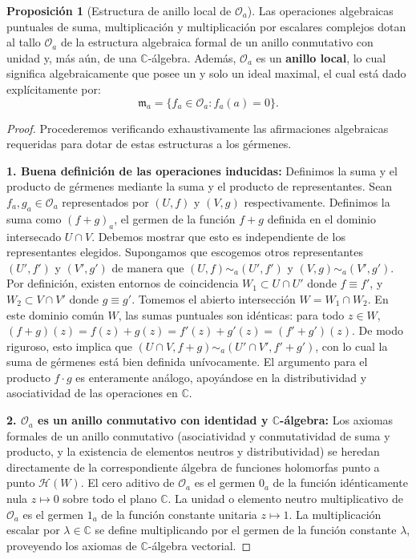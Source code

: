 \documentclass[11pt,a4paper]{article}
\theoremstyle{definition}
\newtheorem{proposicion}{Proposición}[section]
\theoremstyle{remark}
\numberwithin{equation}{section}
\begin{document}
\begin{proposicion}[Estructura de anillo local de $\mathcal{O}_a$]
Las operaciones algebraicas puntuales de suma, multiplicación y multiplicación por escalares complejos dotan al tallo $\mathcal{O}_a$ de la estructura algebraica formal de un anillo conmutativo con unidad y, más aún, de una $\mathbb{C}$-álgebra. Además, $\mathcal{O}_a$ es un \textbf{anillo local}, lo cual significa algebraicamente que posee un y solo un ideal maximal, el cual está dado explícitamente por:
\begin{equation}
\mathfrak{m}_a = \{ f_a \in \mathcal{O}_a : f_a(a) = 0 \}.
\end{equation}
\end{proposicion}
\begin{proof}
Procederemos verificando exhaustivamente las afirmaciones algebraicas requeridas para dotar de estas estructuras a los gérmenes.

\textbf{1. Buena definición de las operaciones inducidas:}
Definimos la suma y el producto de gérmenes mediante la suma y el producto de representantes. Sean $f_a, g_a \in \mathcal{O}_a$ representados por $(U, f)$ y $(V, g)$ respectivamente. Definimos la suma como $(f+g)_a$, el germen de la función $f+g$ definida en el dominio intersecado $U \cap V$. Debemos mostrar que esto es independiente de los representantes elegidos. Supongamos que escogemos otros representantes $(U', f')$ y $(V', g')$ de manera que $(U, f) \sim_a (U', f')$ y $(V, g) \sim_a (V', g')$. Por definición, existen entornos de coincidencia $W_1 \subset U \cap U'$ donde $f \equiv f'$, y $W_2 \subset V \cap V'$ donde $g \equiv g'$. Tomemos el abierto intersección $W = W_1 \cap W_2$. En este dominio común $W$, las sumas puntuales son idénticas: para todo $z \in W$, $(f+g)(z) = f(z)+g(z) = f'(z)+g'(z) = (f'+g')(z)$. De modo riguroso, esto implica que $(U \cap V, f+g) \sim_a (U' \cap V', f'+g')$, con lo cual la suma de gérmenes está bien definida unívocamente. El argumento para el producto $f \cdot g$ es enteramente análogo, apoyándose en la distributividad y asociatividad de las operaciones en $\mathbb{C}$.

\textbf{2. $\mathcal{O}_a$ es un anillo conmutativo con identidad y $\mathbb{C}$-álgebra:}
Los axiomas formales de un anillo conmutativo (asociatividad y conmutatividad de suma y producto, y la existencia de elementos neutros y distributividad) se heredan directamente de la correspondiente álgebra de funciones holomorfas punto a punto $\mathcal{H}(W)$.
El cero aditivo de $\mathcal{O}_a$ es el germen $0_a$ de la función idénticamente nula $z \mapsto 0$ sobre todo el plano $\mathbb{C}$.
La unidad o elemento neutro multiplicativo de $\mathcal{O}_a$ es el germen $1_a$ de la función constante unitaria $z \mapsto 1$.
La multiplicación escalar por $\lambda \in \mathbb{C}$ se define multiplicando por el germen de la función constante $\lambda$, proveyendo los axiomas de $\mathbb{C}$-álgebra vectorial.


\end{proof}
\end{document}
